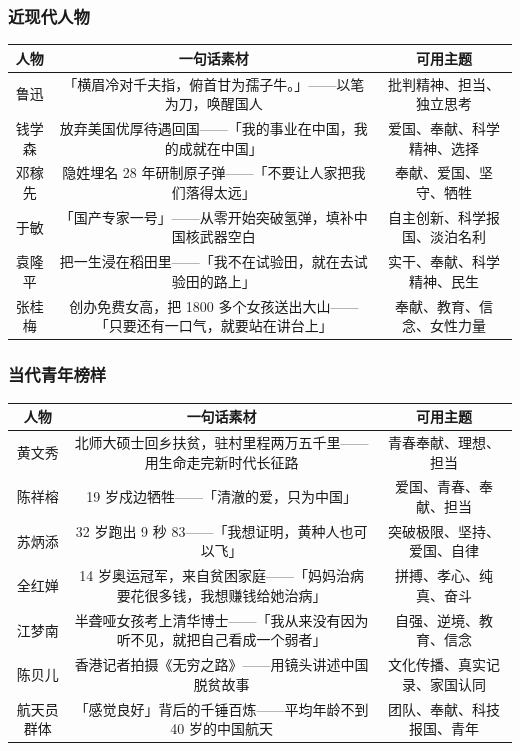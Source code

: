\subsubsection{近现代人物}

\begin{center}
\begin{tabular}{c|c|c}
\textbf{人物} & \textbf{一句话素材} & \textbf{可用主题} \\ \hline
鲁迅 & 「横眉冷对千夫指，俯首甘为孺子牛。」——以笔为刀，唤醒国人 & 批判精神、担当、独立思考 \\
钱学森 & 放弃美国优厚待遇回国——「我的事业在中国，我的成就在中国」 & 爱国、奉献、科学精神、选择 \\
邓稼先 & 隐姓埋名 28 年研制原子弹——「不要让人家把我们落得太远」 & 奉献、爱国、坚守、牺牲 \\
于敏 & 「国产专家一号」——从零开始突破氢弹，填补中国核武器空白 & 自主创新、科学报国、淡泊名利 \\
袁隆平 & 把一生浸在稻田里——「我不在试验田，就在去试验田的路上」 & 实干、奉献、科学精神、民生 \\
张桂梅 & 创办免费女高，把 1800 多个女孩送出大山——「只要还有一口气，就要站在讲台上」 & 奉献、教育、信念、女性力量 \\
\end{tabular}
\end{center}

\subsubsection{当代青年榜样}

\begin{center}
\begin{tabular}{c|c|c}
\textbf{人物} & \textbf{一句话素材} & \textbf{可用主题} \\ \hline
黄文秀 & 北师大硕士回乡扶贫，驻村里程两万五千里——用生命走完新时代长征路 & 青春奉献、理想、担当 \\
陈祥榕 & 19 岁戍边牺牲——「清澈的爱，只为中国」 & 爱国、青春、奉献、担当 \\
苏炳添 & 32 岁跑出 9 秒 83——「我想证明，黄种人也可以飞」 & 突破极限、坚持、爱国、自律 \\
全红婵 & 14 岁奥运冠军，来自贫困家庭——「妈妈治病要花很多钱，我想赚钱给她治病」 & 拼搏、孝心、纯真、奋斗 \\
江梦南 & 半聋哑女孩考上清华博士——「我从来没有因为听不见，就把自己看成一个弱者」 & 自强、逆境、教育、信念 \\
陈贝儿 & 香港记者拍摄《无穷之路》——用镜头讲述中国脱贫故事 & 文化传播、真实记录、家国认同 \\
航天员群体 & 「感觉良好」背后的千锤百炼——平均年龄不到 40 岁的中国航天 & 团队、奉献、科技报国、青年 \\
\end{tabular}
\end{center}

